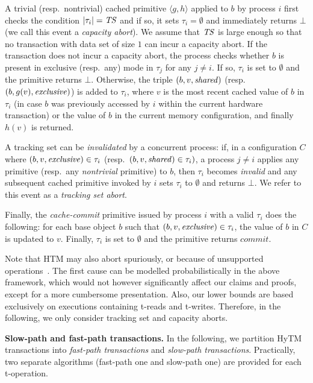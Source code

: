 A trivial (resp.\ nontrivial) 
cached primitive $\langle g,h \rangle$ applied to $b$ 
by process $i$ first checks the condition $|\tau_i|=\mathit{TS}$ and if so, it
sets $\tau_i=\emptyset$ and immediately returns $\bot$ (we call this event a
\emph{capacity abort}). 
We assume that $\mathit{TS}$ is large enough so that no transaction 
with data set of size $1$ can incur a capacity abort.
%
If the transaction does not incur a capacity abort, the process checks whether $b$ is present in exclusive
(resp.\ any) mode in $\tau_j$ 
for any $j\neq i$. If so, $\tau_i$ is set to $\emptyset$ and the
primitive returns $\bot$. 
%
Otherwise, the triple $(b, v, \mathit{shared})$ (resp. $(b, g(v), \mathit{exclusive})$)
is added to $\tau_i$,  where $v$ is the most recent cached value of $b$ in $\tau_i$
(in case $b$ was previously accessed by $i$ within the current
hardware transaction) or the value of $b$ in the current
memory configuration, and finally $h(v)$ is returned.
%

A tracking set can be \emph{invalidated} by a concurrent process: 
if, in a configuration $C$ where  $(b,v,\mathit{exclusive})\in\tau_i$
(resp.\ $(b,v,\mathit{shared})\in\tau_i)$,  a process $j\neq i$ applies any primitive 
(resp.\ any \emph{nontrivial} primitive) to $b$, then $\tau_i$ becomes
\emph{invalid} and any subsequent cached primitive invoked by $i$
sets $\tau_i$ to $\emptyset$ and returns $\bot$. We refer to this event as a \emph{tracking set abort}.

Finally, the \emph{cache-commit} primitive issued by process $i$ with
a valid $\tau_i$ does the following: for each base object $b$ such that $(b,v,\mathit{exclusive}) \in \tau_i$, the value of $b$ in $C$ is updated to $v$. 
Finally, $\tau_i$ is set to $\emptyset$ and the primitive 
returns $\textit{commit}$. 

Note that HTM may also abort spuriously, or because of unsupported operations~\cite{Rei12}. 
The first cause can be modelled probabilistically in the above
framework, which would not however significantly affect our claims and proofs, except for a more cumbersome presentation. 
Also, our lower bounds are based exclusively on executions containing t-reads and t-writes. 
Therefore, in the following, we only consider tracking set and capacity aborts.  

\vspace{1mm}\noindent\textbf{Slow-path and fast-path transactions.}
In the following, we partition HyTM transactions into \emph{fast-path
  transactions} and \emph{slow-path transactions}.
Practically,  two separate algorithms (fast-path one and slow-path one) 
are provided for each t-operation. 

